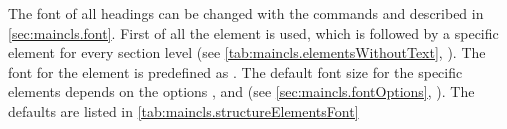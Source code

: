 %
%
The font of all headings %
can be changed with the commands
 and
 described in
\autoref{sec:maincls.font}. First of all the element
 is used, which
is followed by a specific element for every section level (see
\autoref{tab:maincls.elementsWithoutText},
). The font for the element
 is predefined as
%
. The default font size for the specific elements depends
on the options ,  and
 (see \autoref{sec:maincls.fontOptions},
). The
defaults are listed in \autoref{tab:maincls.structureElementsFont}
%
